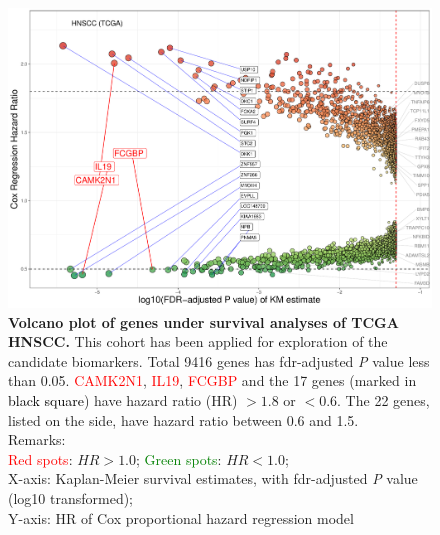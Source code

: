 \documentclass[preprint,12pt]{elsarticle}
\newcommand{\bcaption}[2]{\caption{\textbf{#1} #2}}
\newenvironment{MyColorPar}[1]{%
    \leavevmode\color{#1}\ignorespaces%
}{%
}%
\begin{document}
\begin{MyColorPar}{blue}
\begin{figure}
    \centering
    \includegraphics[width=13cm]{Rplot_TCGA_HNSCC_CoxHR_CAMK2N1_top3FDRKM.pdf}
    \bcaption{Volcano plot of genes under survival analyses of TCGA HNSCC.}{
    This cohort has been applied for exploration of the candidate biomarkers.
    Total 9416 genes has \acrshort{fdr}-adjusted \textit{P} value less than 0.05.
    \textcolor{red}{CAMK2N1}, \textcolor{red}{IL19}, \textcolor{red}{FCGBP} and the 17 genes (marked in \textcolor{black}{black square}) have hazard ratio (HR) $> 1.8$ or $< 0.6$.
    The 22 genes, listed on the side, have hazard ratio between 0.6 and 1.5.\\
    Remarks:\\
    \textcolor{red}{Red spots}: $HR > 1.0$;
    \textcolor{green}{Green spots}: $HR < 1.0$;\\
    X-axis: Kaplan-Meier survival estimates, with \acrshort{fdr}-adjusted \textit{P} value (log10 transformed);\\
    Y-axis: HR of Cox proportional hazard regression model\\
    }
    \label{fig:hazards3}
\end{figure}



\end{MyColorPar}
\end{document}
